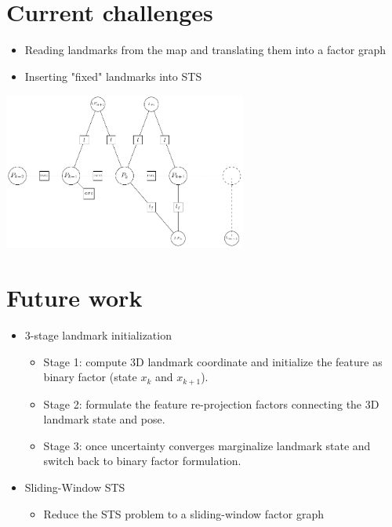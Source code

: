 \documentclass[%
    fourtothree=true, %
    DepLogo=true     %
    ]{ETHpres}
\begin{document}
		
		
\clearpage

\ETHslide
\section*{Current challenges}
\begin{itemize}
	\item[\ETHitem] Reading landmarks from the map and translating them into a factor graph
	\item[\ETHitem] Inserting "fixed" landmarks into STS
\end{itemize}

\begin{center}
\includegraphics[width=0.6\textwidth]{TikZ_drawings/factor_graph_small/factor_graph.pdf}\\
\end{center}

\clearpage

\ETHslide
\section*{Future work}
\begin{itemize}
	\item[\ETHitem] 3-stage landmark initialization
	\begin{itemize}
		\item Stage 1: compute 3D landmark coordinate and initialize the feature as binary factor (state $x_k$ and $x_{k+1}$).
		\item Stage 2: formulate the feature re-projection factors connecting the 3D landmark state and pose.
		\item Stage 3: once uncertainty converges marginalize landmark state and switch back to binary factor formulation.
	\end{itemize}
 	\item[\ETHitem] Sliding-Window STS
	\begin{itemize}
		\item Reduce the STS problem to a sliding-window factor graph		
	\end{itemize} 	
\end{itemize}

\clearpage

\end{document}

